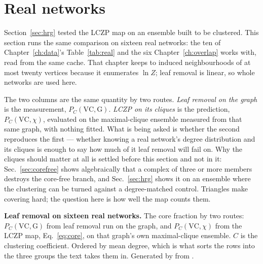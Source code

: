 \section{Real networks}
\label{sec:realcore}

Section~\ref{sec:hrg} tested the LCZP map on an ensemble built to be
clustered. This section runs the same comparison on sixteen real
networks: the ten of Chapter~\ref{ch:data}'s
Table~\ref{tab:real} and the six Chapter~\ref{ch:overlap} works with, read from
the same cache. That chapter keeps to induced neighbourhoods of at most twenty
vertices because it enumerates $\ln Z$; leaf removal is linear, so whole
networks are used here.

The two columns are the same quantity by two routes. \emph{Leaf removal on
the graph} is the measurement, $P_{C}(\mathrm{VC},\mathrm{G})$. \emph{LCZP on
its cliques} is the prediction, $P_{C}(\mathrm{VC},\chi)$, evaluated on the
maximal-clique ensemble measured from that same graph, with nothing fitted.
What is being asked is whether the second reproduces the first --- whether
knowing a real network's degree distribution and its cliques is enough to say
how much of it leaf removal will fail on. Why the cliques should matter at all
is settled before this section and not in it: Sec.~\ref{sec:corefree} shows
algebraically that a complex of three or more members destroys the core-free
branch, and Sec.~\ref{sec:hrg} shows it on an ensemble where the clustering can
be turned against a degree-matched control. Triangles make covering hard; the
question here is how well the map counts them.

\begin{table}[t]
\centering\small
\begin{adjustbox}{max width=\linewidth}

\end{adjustbox}
\caption{\textbf{Leaf removal on sixteen real networks.} The core fraction by
two routes: $P_{C}(\mathrm{VC},\mathrm{G})$ from leaf removal run on the
graph, and $P_{C}(\mathrm{VC},\chi)$ from the LCZP map, Eq.~\eqref{eq:core}, on
that graph's own maximal-clique ensemble. $C$ is the clustering coefficient.
Ordered by mean degree, which is what sorts the rows into the three groups the
text takes them in. Generated by
 from
.}
\label{tab:realcore}
\end{table}

